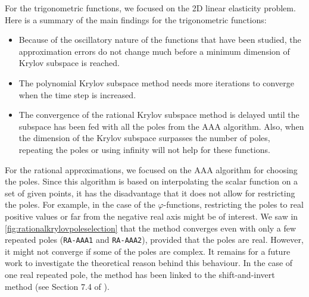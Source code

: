 For the trigonometric functions, we focused on the 2D linear elasticity problem.
Here is a summary of the main findings for the trigonometric functions:
\begin{itemize}
    \item Because of the oscillatory nature of the functions that have been studied,
        the approximation errors do not change much before a minimum dimension of
        Krylov subspace is reached.
    \item The polynomial Krylov subspace method needs more iterations to converge
        when the time step is increased.
    \item The convergence of the rational Krylov subspace method is delayed until
        the subspace has been fed with all the poles from the AAA algorithm.
        Also, when the dimension of the Krylov subspace surpasses the number of poles, repeating the poles or using infinity will not help for these functions.
\end{itemize}

For the rational approximations, we focused on the AAA algorithm for choosing the poles.
Since this algorithm is based on interpolating the scalar function on a set of given
points, it has the disadvantage that it does not allow for restricting the poles. For example, in the case of the $\varphi$-functions, restricting the poles to real positive values
or far from the negative real axis might be of interest.
We saw in \autoref{fig:rationalkrylovpoleselection} that the method converges even with
only a few repeated poles (\texttt{RA-AAA1} and \texttt{RA-AAA2}), provided that the poles
are real. However, it might not converge if some of the poles are complex.
It remains for a future work to investigate the theoretical reason behind this behaviour.
In the case of one real repeated pole, the method has been linked to the shift-and-invert
method (see Section 7.4 of \cite{guttel2010rational}).
